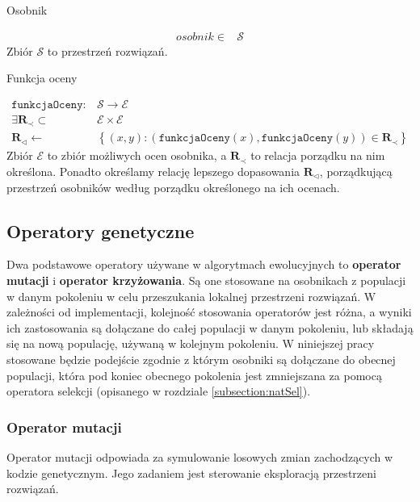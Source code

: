 \documentclass[twoside]{iisthesis}
\newcommand{\important}[1]{\mathcal{#1}}
\newcommand{\R}{\mathbf{R}}
\newcommand{\minorityEvalRel}{{\R}_{\prec}}
\newcommand{\minoritySpecimenRel}{{\R}_{\lhd}}
\newcommand{\param}[1]{\mathtt{#1}}
\begin{document}
\begin{signature}
	\caption{Osobnik \label{signature:specimen}}
	\begin{align}
	osobnik \in &\important{S}
	\end{align}
	Zbiór $\important{S}$ to przestrzeń rozwiązań.
\end{signature}

\begin{signature}
	\caption{Funkcja oceny \label{signature:eval}}
	\begin{align}
		\param{funkcjaOceny}: &\important{S} \rightarrow \important{E} \\
		\exists \minorityEvalRel \subset &\important{E} \times \important{E} \\
		\minoritySpecimenRel \gets &\left\{ (x, y): (\param{funkcjaOceny}(x), \param{funkcjaOceny}(y)) \in \minorityEvalRel \right\}
	\end{align}
	Zbiór $\important{E}$ to zbiór możliwych ocen osobnika, 
	a $\minorityEvalRel$ to relacja porządku na nim określona. Ponadto określamy relację lepszego dopasowania $\minoritySpecimenRel$, porządkującą przestrzeń osobników według porządku określonego na ich ocenach. 
\end{signature}

\subsection{Operatory genetyczne}

Dwa podstawowe operatory używane w algorytmach ewolucyjnych to \textbf{operator mutacji} i \textbf{operator krzyżowania}. Są one stosowane na osobnikach z populacji w danym pokoleniu w celu przeszukania lokalnej przestrzeni rozwiązań. W zależności od implementacji, kolejność stosowania operatorów jest różna, a wyniki ich zastosowania są dołączane do całej populacji w danym pokoleniu, lub składają się na nową populację, używaną w kolejnym pokoleniu. W niniejszej pracy stosowane będzie podejście zgodnie z którym osobniki są dołączane do obecnej populacji, która pod koniec obecnego pokolenia jest zmniejszana za pomocą operatora selekcji (opisanego w rozdziale \ref{subsection:natSel}).

\subsubsection{Operator mutacji}
Operator mutacji odpowiada za symulowanie losowych zmian zachodzących w kodzie genetycznym. Jego zadaniem jest sterowanie eksploracją przestrzeni rozwiązań.
\end{document}
